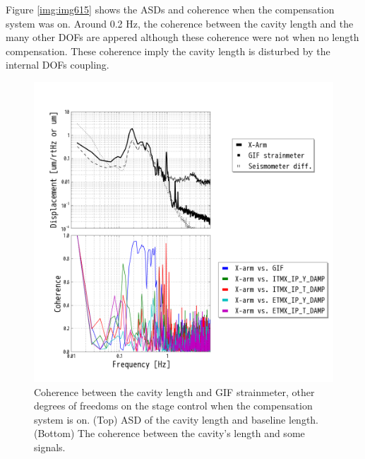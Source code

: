 Figure \ref{img:img615} shows the ASDs and coherence when the compensation system was on. Around 0.2 Hz, the coherence between the cavity length and the many other DOFs are appered although these coherence were not when no length compensation. These coherence imply the cavity length is disturbed by the internal DOFs coupling.

\begin{figure}[p]
    \centering
    \includegraphics[width=15cm]{./img_chap6/img614.png}
    \caption{Coherence between the cavity length and GIF strainmeter, other degrees of freedoms on the stage control when the compensation system is on. (Top) ASD of the cavity length and baseline length. (Bottom) The coherence between the cavity's length and some signals.}\label{img:img614}
\end{figure}
